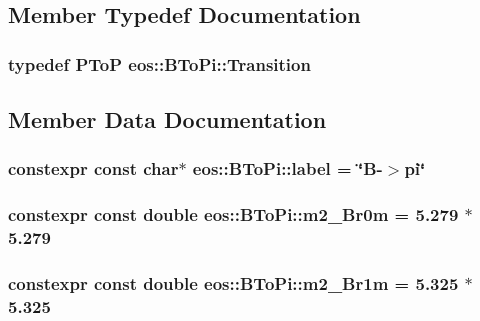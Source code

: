 \subsection{Member Typedef Documentation}
\hypertarget{structeos_1_1BToPi_a0bc02dc01a331ef172cac61430529a37}{
\subsubsection[{Transition}]{\setlength{\rightskip}{0pt plus 5cm}typedef {\bf PToP} {\bf eos::BToPi::Transition}}}
\label{structeos_1_1BToPi_a0bc02dc01a331ef172cac61430529a37}


\subsection{Member Data Documentation}
\hypertarget{structeos_1_1BToPi_a02bedb913444a200791347fcebc02660}{
\subsubsection[{label}]{\setlength{\rightskip}{0pt plus 5cm}constexpr const char$\ast$ {\bf eos::BToPi::label} = \char`\"{}B-\/$>$pi\char`\"{}}}
\label{structeos_1_1BToPi_a02bedb913444a200791347fcebc02660}
\hypertarget{structeos_1_1BToPi_a4bef4550fbc2f545cb28289cde71cf50}{
\subsubsection[{m2\_\-Br0m}]{\setlength{\rightskip}{0pt plus 5cm}constexpr const double {\bf eos::BToPi::m2\_\-Br0m} = 5.279 $\ast$ 5.279}}
\label{structeos_1_1BToPi_a4bef4550fbc2f545cb28289cde71cf50}
\hypertarget{structeos_1_1BToPi_a4e334a932389c4f346a1d7d685e3f6cc}{
\subsubsection[{m2\_\-Br1m}]{\setlength{\rightskip}{0pt plus 5cm}constexpr const double {\bf eos::BToPi::m2\_\-Br1m} = 5.325 $\ast$ 5.325}}
